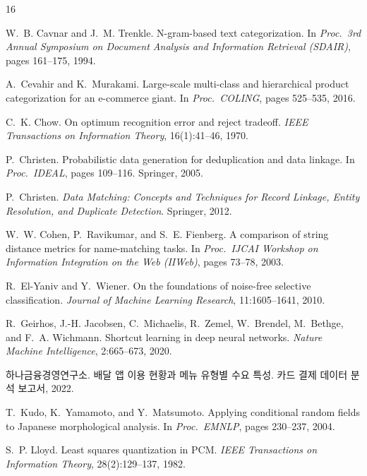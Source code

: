 \documentclass[10pt,twocolumn]{article}
\begin{document}
\begin{thebibliography}{16}\small

W.~B. Cavnar and J.~M. Trenkle.
\newblock N-gram-based text categorization.
\newblock In \emph{Proc.\ 3rd Annual Symposium on Document Analysis and
Information Retrieval (SDAIR)}, pages 161--175, 1994.

A.~Cevahir and K.~Murakami.
\newblock Large-scale multi-class and hierarchical product categorization
for an e-commerce giant.
\newblock In \emph{Proc.\ COLING}, pages 525--535, 2016.

C.~K. Chow.
\newblock On optimum recognition error and reject tradeoff.
\newblock \emph{IEEE Transactions on Information Theory}, 16(1):41--46,
1970.

P.~Christen.
\newblock Probabilistic data generation for deduplication and data linkage.
\newblock In \emph{Proc.\ IDEAL}, pages 109--116. Springer, 2005.

P.~Christen.
\newblock \emph{Data Matching: Concepts and Techniques for Record Linkage,
Entity Resolution, and Duplicate Detection}.
\newblock Springer, 2012.

W.~W. Cohen, P.~Ravikumar, and S.~E. Fienberg.
\newblock A comparison of string distance metrics for name-matching tasks.
\newblock In \emph{Proc.\ IJCAI Workshop on Information Integration on the
Web (IIWeb)}, pages 73--78, 2003.

R.~El-Yaniv and Y.~Wiener.
\newblock On the foundations of noise-free selective classification.
\newblock \emph{Journal of Machine Learning Research}, 11:1605--1641, 2010.

R.~Geirhos, J.-H. Jacobsen, C.~Michaelis, R.~Zemel, W.~Brendel,
M.~Bethge, and F.~A. Wichmann.
\newblock Shortcut learning in deep neural networks.
\newblock \emph{Nature Machine Intelligence}, 2:665--673, 2020.

하나금융경영연구소.
\newblock 배달 앱 이용 현황과 메뉴 유형별 수요 특성. 카드 결제 데이터
분석 보고서, 2022.

T.~Kudo, K.~Yamamoto, and Y.~Matsumoto.
\newblock Applying conditional random fields to Japanese morphological
analysis.
\newblock In \emph{Proc.\ EMNLP}, pages 230--237, 2004.

S.~P. Lloyd.
\newblock Least squares quantization in PCM.
\newblock \emph{IEEE Transactions on Information Theory}, 28(2):129--137,
1982.


\end{thebibliography}
\end{document}
